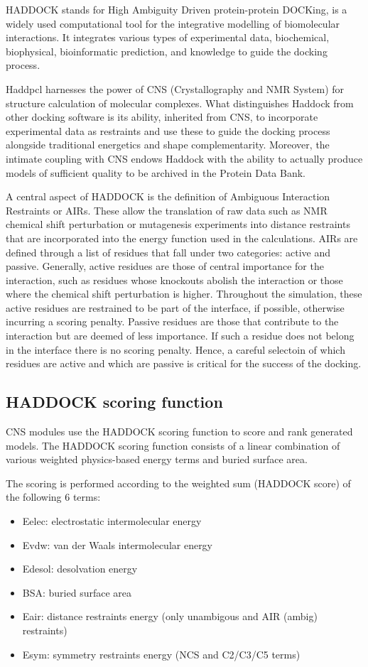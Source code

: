 
HADDOCK stands for High Ambiguity Driven protein-protein DOCKing, is a
widely used computational tool for the integrative modelling of biomolecular
interactions. It integrates various types of experimental data, biochemical,
biophysical, bioinformatic prediction, and knowledge  to guide the docking
process.

Haddpcl harnesses the power of CNS (Crystallography and NMR System) for
structure calculation of molecular complexes. What distinguishes Haddock from
other docking software is its ability, inherited from CNS, to incorporate
experimental data as restraints and use these to guide the docking process
alongside traditional energetics and shape complementarity. Moreover, the
intimate coupling with CNS endows Haddock with the ability to actually produce
models of sufficient quality to be archived in the Protein Data Bank.

A central aspect of HADDOCK is the definition of Ambiguous Interaction
Restraints or AIRs. These allow the translation of raw data such as NMR
chemical shift perturbation or mutagenesis experiments into distance
restraints that are incorporated into the energy function used in the calculations.
AIRs are defined through a list of residues that fall under two categories:
active and passive. Generally, active residues are those of central importance
for the interaction, such as residues whose knockouts abolish the interaction or
those where the chemical shift perturbation is higher. Throughout the simulation,
these active residues are restrained to be part of the interface, if possible,
otherwise incurring a scoring penalty. Passive residues are those that contribute
to the interaction but are deemed of less importance. If such a residue does
not belong in the interface there is no scoring penalty. Hence, a careful
selectoin of which residues are active and which are passive is critical for the
success of the docking.

\subsection{HADDOCK scoring function}
CNS modules use the HADDOCK scoring function to score and rank generated models.
The HADDOCK scoring function consists of a linear combination of various weighted
physics-based energy terms and buried surface area.

The scoring is performed according to the weighted sum (HADDOCK score) of the
following 6 terms:
\begin{itemize}
    \item Eelec: electrostatic intermolecular energy
    \item Evdw: van der Waals intermolecular energy
    \item Edesol: desolvation energy
    \item BSA: buried surface area
    \item Eair: distance restraints energy (only unambigous and AIR (ambig) restraints)
    \item Esym: symmetry restraints energy (NCS and C2/C3/C5 terms)
\end{itemize}


